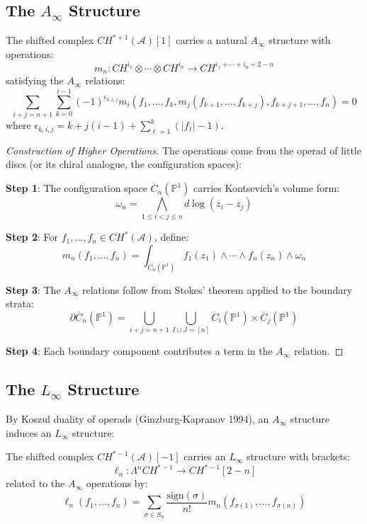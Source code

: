 \subsection{The $A_\infty$ Structure}

\begin{theorem}
The shifted complex $CH^{*+1}(\mathcal{A})[1]$ carries a natural $A_\infty$ structure with operations:
\[
m_n: CH^{i_1} \otimes \cdots \otimes CH^{i_n} \to CH^{i_1 + \cdots + i_n + 2 - n}
\]
satisfying the $A_\infty$ relations:
\[
\sum_{i+j=n+1} \sum_{k=0}^{i-1} (-1)^{\epsilon_{k,i,j}} m_i(f_1, \ldots, f_k, m_j(f_{k+1}, \ldots, f_{k+j}), f_{k+j+1}, \ldots, f_n) = 0
\]
where $\epsilon_{k,i,j} = k + j(i-1) + \sum_{\ell=1}^k (|f_\ell| - 1)$.
\end{theorem}

\begin{proof}[Construction of Higher Operations]
The operations come from the operad of little discs (or its chiral analogue, the configuration spaces):

\textbf{Step 1}: The configuration space $\overline{C}_n(\mathbb{P}^1)$ carries Kontsevich's volume form:
\[
\omega_n = \bigwedge_{1 \leq i < j \leq n} d\log(z_i - z_j)
\]

\textbf{Step 2}: For $f_1, \ldots, f_n \in CH^*(\mathcal{A})$, define:
\[
m_n(f_1, \ldots, f_n) = \int_{\overline{C}_n(\mathbb{P}^1)} f_1(z_1) \wedge \cdots \wedge f_n(z_n) \wedge \omega_n
\]

\textbf{Step 3}: The $A_\infty$ relations follow from Stokes' theorem applied to the boundary strata:
\[
\partial \overline{C}_n(\mathbb{P}^1) = \bigcup_{i+j=n+1} \bigcup_{I \sqcup J = [n]} \overline{C}_i(\mathbb{P}^1) \times \overline{C}_j(\mathbb{P}^1)
\]

\textbf{Step 4}: Each boundary component contributes a term in the $A_\infty$ relation. \qedhere
\end{proof}

\subsection{The $L_\infty$ Structure}

By Koszul duality of operads (Ginzburg-Kapranov 1994), an $A_\infty$ structure induces an $L_\infty$ structure:

\begin{theorem}
The shifted complex $CH^{*-1}(\mathcal{A})[-1]$ carries an $L_\infty$ structure with brackets:
\[
\ell_n: \Lambda^n CH^{*-1} \to CH^{*-1}[2-n]
\]
related to the $A_\infty$ operations by:
\[
\ell_n(f_1, \ldots, f_n) = \sum_{\sigma \in S_n} \frac{\text{sign}(\sigma)}{n!} m_n(f_{\sigma(1)}, \ldots, f_{\sigma(n)})
\]
\end{theorem}

